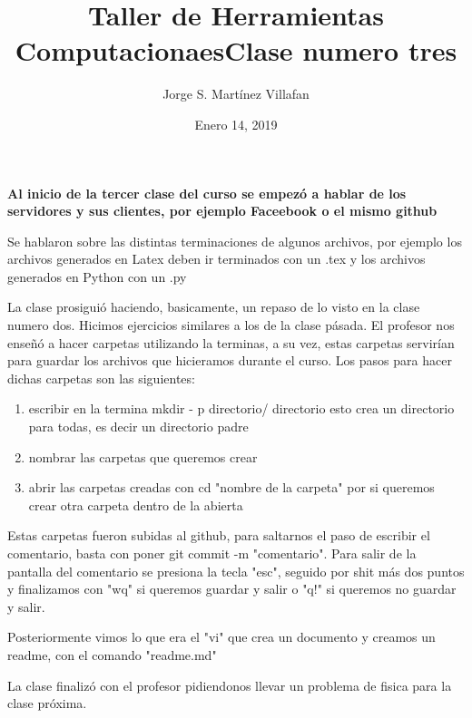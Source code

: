 \documentclass[letterpaper, 12pt, oneside]{article}%
\title{\Huge Taller de Herramientas Computacionaes}
\author{Jorge S. Martínez Villafan}
\date{Enero 14, 2019}
\begin{document}
\maketitle
\newpage
\title{Clase numero tres}

\textbf{Al inicio de la tercer clase del curso se empezó a hablar de los servidores y sus clientes, por ejemplo Faceebook o el mismo github}

Se hablaron sobre las distintas terminaciones de algunos archivos, por ejemplo los archivos generados en Latex deben ir terminados con un .tex y los archivos generados en Python con un .py

La clase prosiguió haciendo, basicamente, un repaso de lo visto en la clase numero dos. Hicimos ejercicios similares a los de la clase pásada. 
El profesor nos enseñó a hacer carpetas utilizando la terminas, a su vez, estas carpetas servirían para guardar los archivos que hicieramos durante el curso. Los pasos para hacer dichas carpetas son las siguientes:
\begin{enumerate}
	\item escribir en la termina mkdir - p directorio/ directorio esto crea un directorio para todas, es decir un directorio padre
	\item nombrar las carpetas que queremos crear 
	\item abrir las carpetas creadas con cd "nombre de la carpeta" por si queremos crear otra carpeta dentro de la abierta
	

\end{enumerate}

Estas carpetas fueron subidas al github, para saltarnos el paso de escribir el comentario, basta con poner git commit -m "comentario".
Para salir de la pantalla del comentario se presiona la tecla "esc", seguido por shit más dos puntos y finalizamos con "wq" si queremos guardar y salir o "q!" si queremos no guardar y salir.

Posteriormente vimos lo que era el "vi" que crea un documento y creamos un readme, con el comando "readme.md"


La clase finalizó con el profesor pidiendonos llevar un problema de fisica para la clase próxima.
\end{document}
